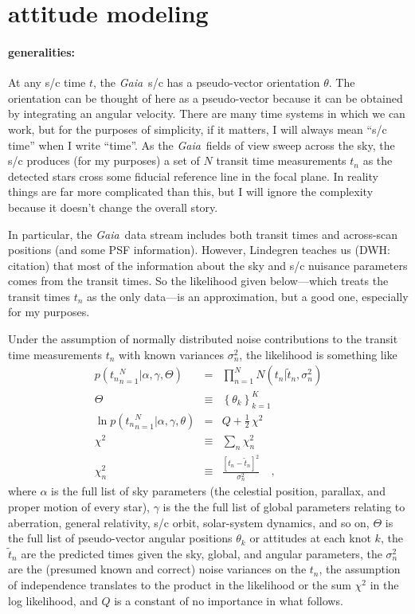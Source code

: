 \documentclass[12pt]{article}
\newcommand{\project}[1]{\textsl{#1}}
\newcommand{\gaia}{\project{Gaia}}
\begin{document}
\section{attitude modeling}

\paragraph{generalities:}
At any s/c time $t$, the \gaia\ s/c has a pseudo-vector orientation
$\theta$.  The orientation can be thought of here as a pseudo-vector
because it can be obtained by integrating an angular velocity.  There
are many time systems in which we can work, but for the purposes of
simplicity, if it matters, I will always mean ``s/c time'' when I
write ``time''.  As the \gaia\ fields of view sweep across the sky,
the s/c produces (for my purposes) a set of $N$ transit time
measurements $t_n$ as the detected stars cross some fiducial reference
line in the focal plane.  In reality things are far more complicated
than this, but I will ignore the complexity because it doesn't change
the overall story.

In particular, the \gaia\ data stream includes both transit times and
across-scan positions (and some PSF information).  However, Lindegren
teaches us (DWH: citation) that most of the information about the sky
and s/c nuisance parameters comes from the transit times.  So the
likelihood given below---which treats the transit times $t_n$ as the
only data---is an approximation, but a good one, especially for my
purposes.

Under the assumption of normally distributed noise contributions to
the transit time measurements $t_n$ with known variances $\sigma^2_n$,
the likelihood is something like
\begin{eqnarray}\displaystyle
p({t_n}_{n=1}^N|\alpha,\gamma,\Theta) &=& \prod_{n=1}^N N(t_n|\tilde{t}_n, \sigma^2_n)
\\
\Theta &\equiv& \left\{\theta_k \right\}_{k=1}^K
\\
\ln p({t_n}_{n=1}^N|\alpha,\gamma,\theta) &=& Q + \frac{1}{2}\,\chi^2
\\
\chi^2 &\equiv& \sum_n \chi^2_n
\\
\chi^2_n &\equiv& \frac{[t_n - \tilde{t}_n]^2}{\sigma^2_n}
\quad ,
\end{eqnarray}
where $\alpha$ is the full list of sky parameters (the celestial
position, parallax, and proper motion of every star), $\gamma$ is the
the full list of global parameters relating to aberration, general
relativity, s/c orbit, solar-system dynamics, and so on, $\Theta$ is
the full list of pseudo-vector angular positions $\theta_k$ or
attitudes at each knot $k$, the $\tilde{t}_n$ are the predicted times
given the sky, global, and angular parameters, the $\sigma^2_n$ are
the (presumed known and correct) noise variances on the $t_n$, the
assumption of independence translates to the product in the likelihood
or the sum $\chi^2$ in the log likelihood, and $Q$ is a constant of no
importance in what follows.
\end{document}
